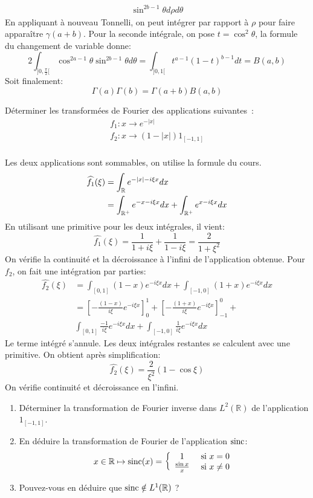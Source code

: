\documentclass[a4paper, 12pt]{amsart}
\begin{document}
\begin{enumerate}
\begin{align*}
\sin^{2b-1}\theta d\rho d\theta
\end{align*}
En appliquant à nouveau Tonnelli, on peut intégrer par rapport à $\rho$ pour
faire apparaître $\gamma(a+b)$. Pour la seconde intégrale, on pose $t = \cos^2
\theta$, la formule du changement de variable donne:
\[
2\int_{]0, \frac{\pi}{2}[} \cos^{2a-1}\theta
\sin^{2b-1}\theta d\theta = \int_{]0,1[} t^{a-1}\left(1-t\right)^{b-1}dt =
B(a,b)
\]
Soit finalement:
\[
 \Gamma(a)\Gamma(b)=\Gamma(a+b)B(a,b)
\]
\begin{fex}
Déterminer les transformées de Fourier des applications suivantes~:
\[
\begin{array}{c}
f_1 \colon x \to e^{-|x|} \\
f_2 \colon x \to (1-|x|)1_{[-1,1]} \\
\end{array}
\]
\end{fex}
Les deux applications sont sommables, on utilise la formule du cours.
\begin{align*}
 \widehat{f_1}(\xi) & = \int_{\mathbb{R}} e^{-|x|-i\xi x } dx \\
& =  \int_{\mathbb{R}^+}e^{-x-i\xi x
} dx + \int_{\mathbb{R}^+}e^{x-i\xi x }
dx
\end{align*}
En utilisant une primitive pour les deux intégrales, il vient:
\[
  \widehat{f_1}(\xi) = \frac{1}{1+i\xi} + \frac{1}{1-i\xi} = \frac{2}{1+\xi^2}
\]
On vérifie la continuité et la décroissance à l'infini de l'application
obtenue. 
Pour $f_2$, on fait une intégration par parties:
\begin{align*}
 \widehat{f_2}(\xi) & = \int_{[0,1]} (1-x)e^{-i\xi x}dx +
\int_{[-1,0]}(1+x)e^{-i\xi x}dx \\
& = \left[ -\frac{(1-x)}{i\xi}e^{-i\xi x}\right]_0^1 + \left[
-\frac{(1+x)}{i\xi}e^{-i\xi x}\right]_{-1}^0 + \\
& \int_{[0,1]}\frac{-1}{i\xi} e^{-i\xi x} dx + \int_{[-1,0]}\frac{1}{i\xi}
e^{-i\xi x} dx
\end{align*}
Le terme intégré s'annule. Les deux intégrales restantes se calculent avec une
primitive. On obtient après simplification:
\[
 \widehat{f_2}(\xi) = \frac{2}{\xi^2}\left(1-\cos \xi \right)
\]
On vérifie continuité et décroissance en l'infini.
\end{enumerate}
\begin{fex}
\begin{enumerate}
  \item Déterminer la transformation de Fourier inverse dans $L^2(\mathbb{R})$
  de l'application $1_{[-1,1]}$.
  \item En déduire la transformation de Fourier de l'application $\operatorname*{sinc}$:
  \[
  x \in \mathbb{R} \mapsto \operatorname*{sinc}(x) = \left\{
  \begin{array}{cc}
  	1 & \text{ si } x=0 \\
  	\frac{\sin x}{x} & \text{ si } x \neq 0 
  \end{array}
  \right.
  \]
  \item Pouvez-vous en déduire que $\operatorname*{sinc} \notin L^1(\mathbb{R})$ ?
\end{enumerate}
\end{fex}
\end{document}

